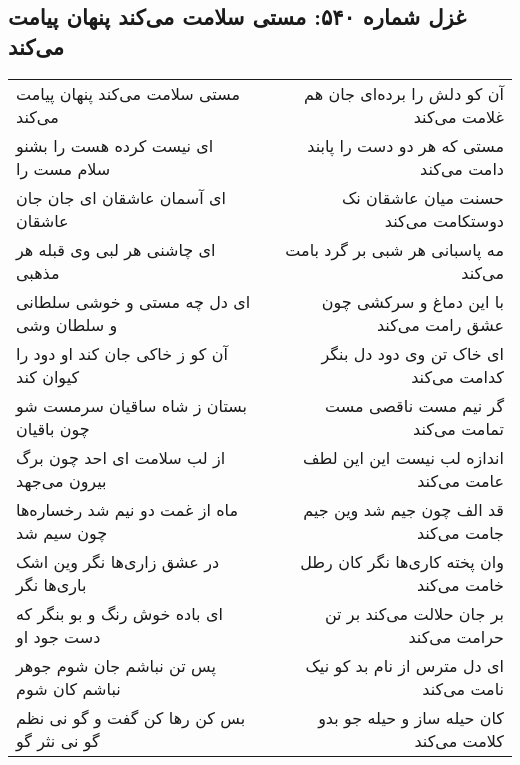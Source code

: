 \begin{center}
\section*{غزل شماره ۵۴۰: مستی سلامت می‌کند پنهان پیامت می‌کند}
\label{sec:0540}
\begin{longtable}{l p{0.5cm} r}
مستی سلامت می‌کند پنهان پیامت می‌کند
&&
آن کو دلش را برده‌ای جان هم غلامت می‌کند
\\
ای نیست کرده هست را بشنو سلام مست را
&&
مستی که هر دو دست را پابند دامت می‌کند
\\
ای آسمان عاشقان ای جان جان عاشقان
&&
حسنت میان عاشقان نک دوستکامت می‌کند
\\
ای چاشنی هر لبی وی قبله هر مذهبی
&&
مه پاسبانی هر شبی بر گرد بامت می‌کند
\\
ای دل چه مستی و خوشی سلطانی و سلطان وشی
&&
با این دماغ و سرکشی چون عشق رامت می‌کند
\\
آن کو ز خاکی جان کند او دود را کیوان کند
&&
ای خاک تن وی دود دل بنگر کدامت می‌کند
\\
بستان ز شاه ساقیان سرمست شو چون باقیان
&&
گر نیم مست ناقصی مست تمامت می‌کند
\\
از لب سلامت ای احد چون برگ بیرون می‌جهد
&&
اندازه لب نیست این این لطف عامت می‌کند
\\
ماه از غمت دو نیم شد رخساره‌ها چون سیم شد
&&
قد الف چون جیم شد وین جیم جامت می‌کند
\\
در عشق زاری‌ها نگر وین اشک باری‌ها نگر
&&
وان پخته کاری‌ها نگر کان رطل خامت می‌کند
\\
ای باده خوش رنگ و بو بنگر که دست جود او
&&
بر جان حلالت می‌کند بر تن حرامت می‌کند
\\
پس تن نباشم جان شوم جوهر نباشم کان شوم
&&
ای دل مترس از نام بد کو نیک نامت می‌کند
\\
بس کن رها کن گفت و گو نی نظم گو نی نثر گو
&&
کان حیله ساز و حیله جو بدو کلامت می‌کند
\\
\end{longtable}
\end{center}
